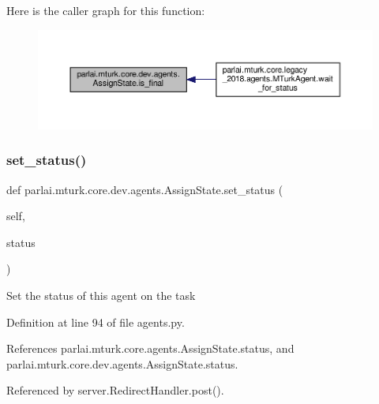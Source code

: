 Here is the caller graph for this function\+:
\nopagebreak
\begin{figure}[H]
\begin{center}
\leavevmode
\includegraphics[width=350pt]{classparlai_1_1mturk_1_1core_1_1dev_1_1agents_1_1AssignState_a169e39dab458bde9c9ee494fc31fab00_icgraph}
\end{center}
\end{figure}
\mbox{\label{classparlai_1_1mturk_1_1core_1_1dev_1_1agents_1_1AssignState_a8a4989ac979fca506d8249d3a749ca0c}} 
\subsubsection{\texorpdfstring{set\+\_\+status()}{set\_status()}}
{\footnotesize\ttfamily def parlai.\+mturk.\+core.\+dev.\+agents.\+Assign\+State.\+set\+\_\+status (\begin{DoxyParamCaption}\item[{}]{self,  }\item[{}]{status }\end{DoxyParamCaption})}

\begin{DoxyVerb}Set the status of this agent on the task\end{DoxyVerb}
 

Definition at line 94 of file agents.\+py.



References parlai.\+mturk.\+core.\+agents.\+Assign\+State.\+status, and parlai.\+mturk.\+core.\+dev.\+agents.\+Assign\+State.\+status.



Referenced by server.\+Redirect\+Handler.\+post().

